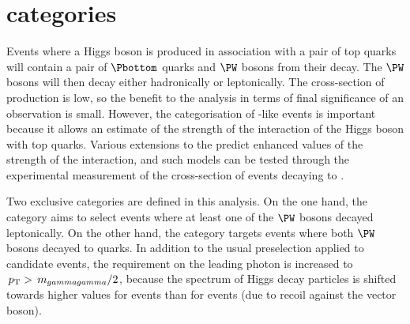 \section{\TTHTag categories}
\label{cat:sec:tthtag}

Events where a Higgs boson is produced in association with a pair of top quarks will contain a pair of $\Pbottom$ quarks and $\PW$ bosons from their decay. The $\PW$ bosons will then decay either hadronically or leptonically. The cross-section of \ttH production is low, so the benefit to the analysis in terms of final significance of an observation is small. However, the categorisation of \ttH-like events is important because it allows an estimate of the strength of the interaction of the Higgs boson with top quarks. Various extensions to the \SM predict enhanced values of the strength of the \ttH interaction, and such models can be tested through the experimental measurement of the cross-section of \ttH events decaying to \Hgg.

Two exclusive \TTHTag categories are defined in this analysis. On the one hand, the \TTHLeptonicTag category aims to select \ttH events where at least one of the $\PW$ bosons decayed leptonically. On the other hand, the \TTHHadronicTag category targets events where both $\PW$ bosons decayed to quarks. In addition to the usual preselection applied to candidate events, the requirement on the leading photon \pT is increased to $\,p_\text{T}>\,m_{gammagamma}/2$, because the \pT spectrum of Higgs decay particles is shifted towards higher values for \ttH events than for \ggH events (due to recoil against the vector boson). %

